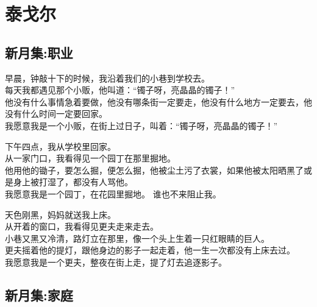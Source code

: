 \documentclass[
]{book}
\renewenvironment{quote}{\begin{VF}}{\end{VF}}
\begin{document}
\hypertarget{section-31}{%
\chapter{泰戈尔}\label{section-31}}

\hypertarget{section-32}{%
\section{新月集:职业}\label{section-32}}

\begin{quote}
早晨，钟敲十下的时候，我沿着我们的小巷到学校去。\\
每天我都遇见那个小贩，他叫道：``镯子呀，亮晶晶的镯子！''\\
他没有什么事情急着要做，他没有哪条街一定要走，他没有什么地方一定要去，他没有什么时间一定要回家。\\
我愿意我是一个小贩，在街上过日子，叫着：``镯子呀，亮晶晶的镯子！''

下午四点，我从学校里回家。\\
从一家门口，我看得见一个园丁在那里掘地。\\
他用他的锄子，要怎么掘，便怎么掘，他被尘土污了衣裳，如果他被太阳晒黑了或是身上被打湿了，都没有人骂他。\\
我愿意我是一个园丁，在花园里掘地。 谁也不来阻止我。

天色刚黑，妈妈就送我上床。\\
从开着的窗口，我看得见更夫走来走去。\\
小巷又黑又冷清，路灯立在那里，像一个头上生着一只红眼睛的巨人。\\
更夫摇着他的提灯，跟他身边的影子一起走着，他一生一次都没有上床去过。\\
我愿意我是一个更夫，整夜在街上走，提了灯去追逐影子。
\end{quote}

\hypertarget{section-33}{%
\section{新月集:家庭}\label{section-33}}
\end{document}
